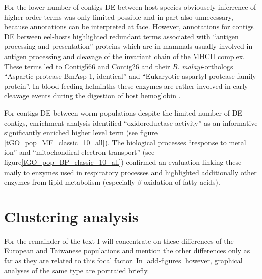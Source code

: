For the lower number of contigs DE between host-species obviousely
inferrence of higher order terms was only limited possible and in part
also unnecessary, because annotations can be interpreted at
face. However, annotations for contigs DE between eel-hosts
highlighted redundant terms associated with ``antigen processing and
presentation'' proteins which are in mammals usually involved in
antigen processing and cleavage of the invariant chain of the MHCII
complex. These terms led to Contig566 and Contig26 and their
\textit{B. malayi}-orthologs ``Aspartic protease BmAsp-1, identical''
and ``Eukaryotic aspartyl protease family protein''. In blood feeding
helminths these enzymes are rather involved in early cleavage events
during the digestion of host hemoglobin \cite{pmid12782060}.



For contigs DE between worm populations despite the limited number of
DE contigs, enrichment analysis identified ``oxidoreductase activity''
as an informative significantly enriched higher level term (see figure
\ref{tGO_pop_MF_classic_10_all}). The biological processes ``response
to metal ion'' and ``mitochondiral electron transport'' (see
figure\ref{tGO_pop_BP_classic_10_all}) confirmed an evaluation linking
these maily to enzymes used in respiratory processes and highlighted
additionally other enzymes from lipid metabolism (especially
$\beta$-oxidation of fatty acids).

\section{Clustering analysis}

For the remainder of the text I will concentrate on these differences
of the European and Taiwanese populations and mention the other
differences only as far as they are related to this focal factor. In
\ref{add-figures} however, graphical analyses of the same type are
portraied briefly.

